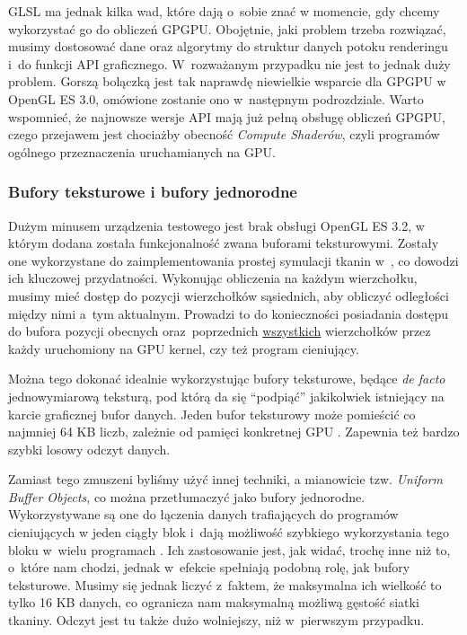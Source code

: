 			GLSL ma jednak kilka wad, które dają o~sobie znać w momencie, gdy chcemy wykorzystać go do obliczeń GPGPU. Obojętnie, jaki problem trzeba rozwiązać, musimy dostosować dane oraz algorytmy do struktur danych potoku renderingu i~do funkcji API graficznego. W~rozważanym przypadku nie jest to jednak duży problem. Gorszą bolączką jest tak naprawdę niewielkie wsparcie dla GPGPU w OpenGL ES 3.0, omówione zostanie ono w~następnym podrozdziale. Warto wspomnieć, że najnowsze wersje API mają już pełną obsługę obliczeń GPGPU, czego przejawem jest chociażby obecność \emph{Compute Shaderów}, czyli programów ogólnego przeznaczenia uruchamianych na GPU.
			
			\subsubsection{Bufory teksturowe i bufory jednorodne}
			\label{t:technologie:narzedzia:bufory}
			
			Dużym minusem urządzenia testowego jest brak obsługi OpenGL ES 3.2, w którym dodana została funkcjonalność zwana buforami teksturowymi. Zostały one wykorzystane do zaimplementowania prostej symulacji tkanin w~\cite{receptury}, co dowodzi ich kluczowej przydatności. Wykonując obliczenia na każdym wierzchołku, musimy mieć dostęp do pozycji wierzchołków sąsiednich, aby obliczyć odległości między nimi a~tym aktualnym. Prowadzi to do konieczności posiadania dostępu do bufora pozycji obecnych oraz~poprzednich \uline{wszystkich} wierzchołków przez każdy uruchomiony na GPU kernel, czy też program cieniujący. 
			
			Można tego dokonać idealnie wykorzystując bufory teksturowe, będące \emph{de facto} jednowymiarową teksturą, pod którą da się ``podpiąć'' jakikolwiek istniejący na karcie graficznej bufor danych. Jeden bufor teksturowy może pomieścić co najmniej 64 KB liczb, zależnie od pamięci konkretnej GPU \cite{opengl_wiki}. Zapewnia też bardzo szybki losowy odczyt danych. 
			
			Zamiast tego zmuszeni byliśmy użyć innej techniki, a mianowicie tzw. \emph{Uniform Buffer Objects}, co można przetłumaczyć jako bufory jednorodne. Wykorzystywane są one do łączenia danych trafiających do programów cieniujących w jeden ciągły blok i~dają możliwość szybkiego wykorzystania tego bloku w~wielu programach \cite{opengl_wiki}. Ich zastosowanie jest, jak widać, trochę inne niż to, o~które nam chodzi, jednak w~efekcie spełniają podobną rolę, jak bufory teksturowe. Musimy się jednak liczyć z~faktem, że maksymalna ich wielkość to tylko 16 KB danych, co ogranicza nam maksymalną możliwą gęstość siatki tkaniny. Odczyt jest tu także dużo wolniejszy, niż w~pierwszym przypadku.
			
